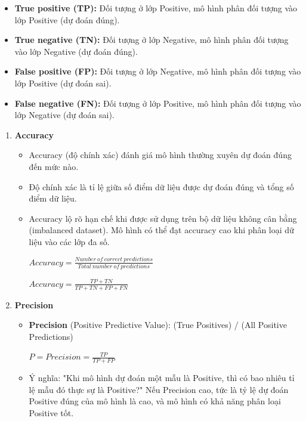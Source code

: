 \begin{itemize}
\item \textbf{True positive (TP):} Đối tượng ở lớp Positive, mô hình phân đối tượng vào lớp Positive (dự đoán đúng).
\item \textbf{True negative (TN):} Đối tượng ở lớp Negative, mô hình phân đối tượng vào lớp Negative (dự đoán đúng).
\item \textbf{False positive (FP):} Đối tượng ở lớp Negative, mô hình phân đối tượng vào lớp Positive (dự đoán sai).
\item \textbf{False negative (FN):} Đối tượng ở lớp Positive, mô hình phân đối tượng vào lớp Negative (dự đoán sai).
\end{itemize}
\begin{enumerate}
    \item \textbf{Accuracy} \cite{accuracy} 
    \begin{itemize}
        \item Accuracy (độ chính xác) đánh giá mô hình thường xuyên dự đoán đúng đến mức nào. 
        \item Độ chính xác là tỉ lệ giữa số điểm dữ liệu được dự đoán đúng và tổng số điểm dữ liệu.
        \item Accuracy lộ rõ hạn chế khi được sử dụng trên bộ dữ liệu không cân bằng (imbalanced dataset). Mô hình có thể đạt accuracy cao khi phân loại dữ liệu vào các lớp đa số.
        \begin{center}
        \large $Accuracy = \frac{Number\ of\ correct\ predictions }{Total\ number\ of\ predictions}$
        \end{center}
        \begin{center}
        \large $Accuracy = \frac{TP + TN}{TP + TN + FP + FN}$
        \end{center}
    \end{itemize}
    
    \item \textbf{Precision} \cite{precision_recall} 
     \begin{itemize}
        \item \textbf{Precision} (Positive Predictive Value): (True Positives) / (All Positive Predictions)
        \begin{center}
        \large $P = Precision = \frac{TP}{TP + FP}$
        \end{center}
        \item Ý nghĩa: "Khi mô hình dự đoán một mẫu là Positive, thì có bao nhiêu tỉ lệ mẫu đó thực sự là Positive?" Nếu Precision cao, tức là tỷ lệ dự đoán Positive đúng của mô hình là cao, và mô hình có khả năng phân loại Positive tốt.
    \end{itemize}


\end{enumerate}
